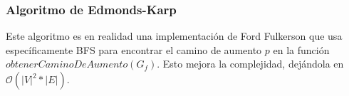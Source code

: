 \subsubsection{Algoritmo de Edmonds-Karp}

Este algoritmo es en realidad una implementaci\'on de Ford Fulkerson que usa espec\'ificamente BFS para encontrar el camino de aumento $p$ en la funci\'on $obtenerCaminoDeAumento(G_f)$. Esto mejora la complejidad, dej\'andola en $\mathcal{O}(|V|^2 * |E|)$.
